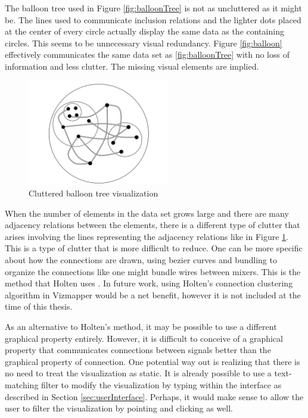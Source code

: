 The balloon tree used in Figure \ref{fig:balloonTree} is not as uncluttered as it might be. The lines used to communicate inclusion relations and the lighter dots placed at the center of every circle actually display the same data as the containing circles. This seems to be unnecessary visual redundancy. Figure \ref{fig:balloon} effectively communicates the same data set as \ref{fig:balloonTree} with no loss of information and less clutter. The missing visual elements are implied.

\begin{figure}[htb]
\centering
\includegraphics[width=0.55\textwidth]{clutter_balloon.png}
\caption{Cluttered balloon tree visualization}
\label{fig:clutterBalloon}
\end{figure}

When the number of elements in the data set grows large and there are many adjacency relations between the elements, there is a different type of clutter that arises involving the lines representing the adjacency relations like in Figure \ref{fig:clutterBalloon}. This is a type of clutter that is more difficult to reduce. One can be more specific about how the connections are drawn, using bezier curves and bundling to organize the connections like one might bundle wires between mixers. This is the method that Holten uses \cite{edgebundles2006}. In future work, using Holten's connection clustering algorithm in Vizmapper would be a net benefit, however it is not included at the time of this thesis. 

As an alternative to Holten's method, it may be possible to use a different graphical property entirely. However, it is difficult to conceive of a graphical property that communicates connections between signals better than the graphical property of connection. One potential way out is realizing that there is no need to treat the visualization as static. It is already possible to use a text-matching filter to modify the visualization by typing within the interface as described in Section \ref{sec:userInterface}. Perhaps, it would make sense to allow the user to filter the visualization by pointing and clicking as well.

